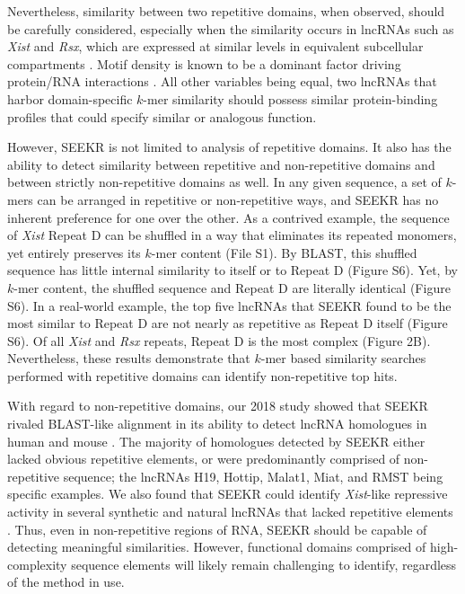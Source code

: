 Nevertheless, similarity between two repetitive domains, when observed, should be carefully considered, especially when the similarity occurs in lncRNAs such as \emph{Xist} and \emph{Rsx}, which are expressed at similar levels in equivalent subcellular compartments \cite{Grant2012RsxInactivation,Wang2014Chromosome-wideDomestica}. Motif density is known to be a dominant factor driving protein/RNA interactions \cite{Dominguez2018SequenceProteins,Kirk2018FunctionalContent,Wang2014Chromosome-wideDomestica}. All other variables being equal, two lncRNAs that harbor domain-specific $k$-mer similarity should possess similar protein-binding profiles that could specify similar or analogous function. 

However, SEEKR is not limited to analysis of repetitive domains. It also has the ability to detect similarity between repetitive and non-repetitive domains and between strictly non-repetitive domains as well. In any given sequence, a set of $k$-mers can be arranged in repetitive or non-repetitive ways, and SEEKR has no inherent preference for one over the other. As a contrived example, the sequence of \emph{Xist} Repeat D can be shuffled in a way that eliminates its repeated monomers, yet entirely preserves its $k$-mer content (File S1). By BLAST, this shuffled sequence has little internal similarity to itself or to Repeat D (Figure S6). Yet, by $k$-mer content, the shuffled sequence and Repeat D are literally identical (Figure S6). In a real-world example, the top five lncRNAs that SEEKR found to be the most similar to Repeat D are not nearly as repetitive as Repeat D itself (Figure S6). Of all \emph{Xist} and \emph{Rsx} repeats, Repeat D is the most complex (Figure 2B). Nevertheless, these results demonstrate that $k$-mer based similarity searches performed with repetitive domains can identify non-repetitive top hits.

With regard to non-repetitive domains, our 2018 study showed that SEEKR rivaled BLAST-like alignment in its ability to detect lncRNA homologues in human and mouse  \cite{Kirk2018FunctionalContent}. The majority of homologues detected by SEEKR either lacked obvious repetitive elements, or were predominantly comprised of non-repetitive sequence; the lncRNAs H19, Hottip, Malat1, Miat, and RMST being specific examples. We also found that SEEKR could identify \emph{Xist}-like repressive activity in several synthetic and natural lncRNAs that lacked repetitive elements \cite{Kirk2018FunctionalContent}. Thus, even in non-repetitive regions of RNA, SEEKR should be capable of detecting meaningful similarities. However, functional domains comprised of high-complexity sequence elements will likely remain challenging to identify, regardless of the method in use.

